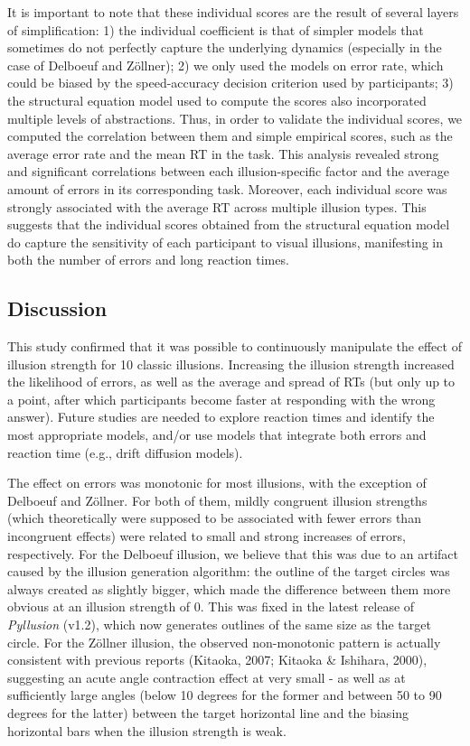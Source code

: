 \documentclass[
  man,floatsintext]{apa6}
\begin{document}
It is important to note that these individual scores are the result of several layers of simplification: 1) the individual coefficient is that of simpler models that sometimes do not perfectly capture the underlying dynamics (especially in the case of Delboeuf and Zöllner); 2) we only used the models on error rate, which could be biased by the speed-accuracy decision criterion used by participants; 3) the structural equation model used to compute the scores also incorporated multiple levels of abstractions. Thus, in order to validate the individual scores, we computed the correlation between them and simple empirical scores, such as the average error rate and the mean RT in the task. This analysis revealed strong and significant correlations between each illusion-specific factor and the average amount of errors in its corresponding task. Moreover, each individual score was strongly associated with the average RT across multiple illusion types. This suggests that the individual scores obtained from the structural equation model do capture the sensitivity of each participant to visual illusions, manifesting in both the number of errors and long reaction times.

\hypertarget{discussion-1}{%
\subsection{Discussion}\label{discussion-1}}

This study confirmed that it was possible to continuously manipulate the effect of illusion strength for 10 classic illusions. Increasing the illusion strength increased the likelihood of errors, as well as the average and spread of RTs (but only up to a point, after which participants become faster at responding with the wrong answer). Future studies are needed to explore reaction times and identify the most appropriate models, and/or use models that integrate both errors and reaction time (e.g., drift diffusion models).

The effect on errors was monotonic for most illusions, with the exception of Delboeuf and Zöllner. For both of them, mildly congruent illusion strengths (which theoretically were supposed to be associated with fewer errors than incongruent effects) were related to small and strong increases of errors, respectively. For the Delboeuf illusion, we believe that this was due to an artifact caused by the illusion generation algorithm: the outline of the target circles was always created as slightly bigger, which made the difference between them more obvious at an illusion strength of 0. This was fixed in the latest release of \emph{Pyllusion} (v1.2), which now generates outlines of the same size as the target circle. For the Zöllner illusion, the observed non-monotonic pattern is actually consistent with previous reports (Kitaoka, 2007; Kitaoka \& Ishihara, 2000), suggesting an acute angle contraction effect at very small - as well as at sufficiently large angles (below 10 degrees for the former and between 50 to 90 degrees for the latter) between the target horizontal line and the biasing horizontal bars when the illusion strength is weak.
\end{document}
